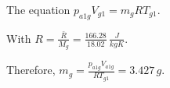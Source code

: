 The equation \( p_{a1g} V_{g1} = m_g R T_{g1} \).

With \( R = \frac{\bar{R}}{M_g} = \frac{166.28}{18.02} \, \frac{J}{kgK} \).

Therefore, \( m_g = \frac{p_{a1g} V_{a1g}}{R T_{g1}} = 3.427 \, g \).